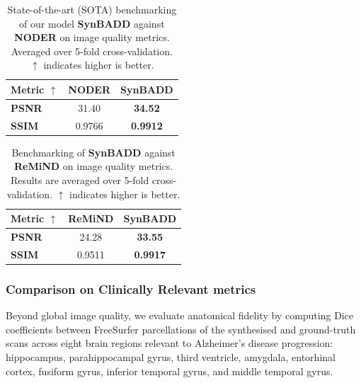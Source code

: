\begin{table}[ht]
\centering
\caption{State-of-the-art (SOTA) benchmarking of our model \textbf{SynBADD} against \textbf{NODER} on image quality metrics. Averaged over 5-fold cross-validation. $\uparrow$ indicates higher is better.}
\begin{tabular}{>{\bfseries}lcc}
\toprule
Metric $\uparrow$ & NODER & SynBADD \\
\midrule
PSNR  & 31.40  & \textbf{34.52} \\
SSIM  & 0.9766 & \textbf{0.9912} \\
\bottomrule
\end{tabular}
\label{tab:sota_noder}
\end{table}

\begin{table}[ht]
\centering
\caption{Benchmarking of \textbf{SynBADD} against \textbf{ReMiND} on image quality metrics. Results are averaged over 5-fold cross-validation. $\uparrow$ indicates higher is better.}
\begin{tabular}{>{\bfseries}lcc}
\toprule
Metric $\uparrow$ & ReMiND & SynBADD \\
\midrule
PSNR  & 24.28  & \textbf{33.55} \\
SSIM  & 0.9511 & \textbf{0.9917} \\
\bottomrule
\end{tabular}
\label{tab:sota_remind}
\end{table}


\subsubsection{Comparison on Clinically Relevant metrics}

Beyond global image quality, we evaluate anatomical fidelity by computing Dice coefficients between FreeSurfer parcellations of the synthesised and ground-truth scans across eight brain regions relevant to Alzheimer's disease progression: hippocampus, parahippocampal gyrus, third ventricle, amygdala, entorhinal cortex, fusiform gyrus, inferior temporal gyrus, and middle temporal gyrus.

